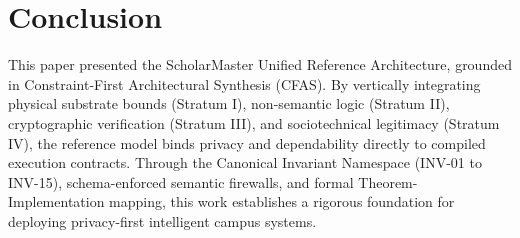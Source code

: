 \documentclass[conference]{IEEEtran}
\begin{document}
\section{Conclusion}
This paper presented the ScholarMaster Unified Reference Architecture, grounded in Constraint-First Architectural Synthesis (CFAS). By vertically integrating physical substrate bounds (Stratum I), non-semantic logic (Stratum II), cryptographic verification (Stratum III), and sociotechnical legitimacy (Stratum IV), the reference model binds privacy and dependability directly to compiled execution contracts. Through the Canonical Invariant Namespace (INV-01 to INV-15), schema-enforced semantic firewalls, and formal Theorem-Implementation mapping, this work establishes a rigorous foundation for deploying privacy-first intelligent campus systems.
\end{document}
